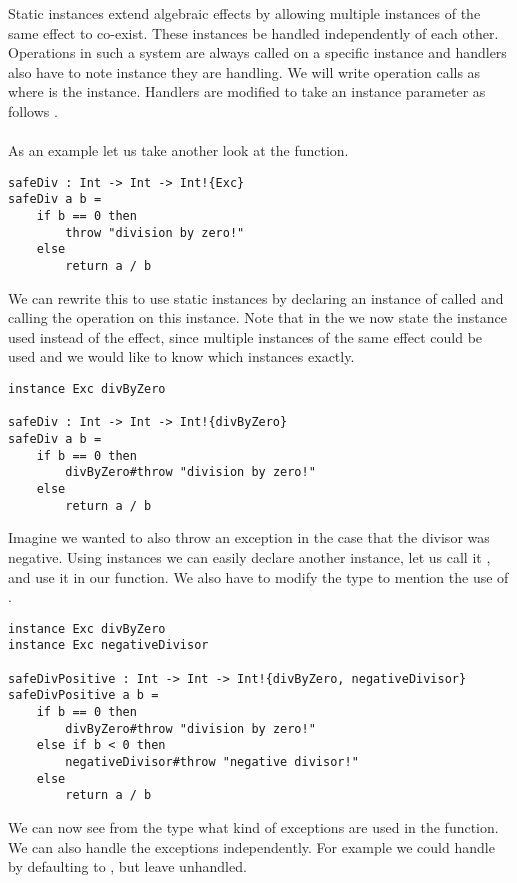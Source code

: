 Static instances extend algebraic effects by allowing multiple instances of the same effect to co-exist.
These instances be handled independently of each other.
Operations in such a system are always called on a specific instance and handlers also have to note instance they are handling.
We will write operation calls as  where  is the instance.
Handlers are modified to take an instance parameter as follows .
\\\\
As an example let us take another look at the  function.

\begin{verbatim}
safeDiv : Int -> Int -> Int!{Exc}
safeDiv a b =
	if b == 0 then
		throw "division by zero!"
	else
		return a / b
\end{verbatim}

We can rewrite this to use static instances by declaring an instance of  called  and calling the  operation on this instance.
Note that in the we now state the instance used instead of the effect, since multiple instances of the same effect could be used and we would like to know which instances exactly.

\begin{verbatim}
instance Exc divByZero

safeDiv : Int -> Int -> Int!{divByZero}
safeDiv a b =
	if b == 0 then
		divByZero#throw "division by zero!"
	else
		return a / b
\end{verbatim}

Imagine we wanted to also throw an exception in the case that the divisor was negative.
Using instances we can easily declare another  instance, let us call it , and use it in our function.
We also have to modify the type to mention the use of .

\begin{verbatim}
instance Exc divByZero
instance Exc negativeDivisor

safeDivPositive : Int -> Int -> Int!{divByZero, negativeDivisor}
safeDivPositive a b =
	if b == 0 then
		divByZero#throw "division by zero!"
	else if b < 0 then
		negativeDivisor#throw "negative divisor!"
	else
		return a / b
\end{verbatim}

We can now see from the type what kind of exceptions are used in the function.
We can also handle the exceptions independently.
For example we could handle  by defaulting to , but leave  unhandled.


